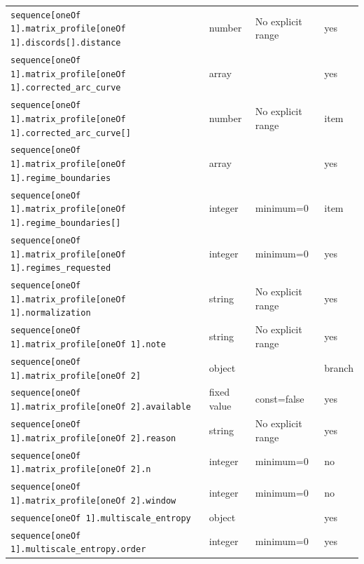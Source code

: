\begin{longtable}{@{}p{}p{}p{}p{}@{}}
\texttt{sequence[oneOf 1].\allowbreak{}matrix\_\allowbreak{}profile[oneOf 1].\allowbreak{}discords[].\allowbreak{}distance} & number & No explicit range & yes\\
\texttt{sequence[oneOf 1].\allowbreak{}matrix\_\allowbreak{}profile[oneOf 1].\allowbreak{}corrected\_\allowbreak{}arc\_\allowbreak{}curve} & array &  & yes\\
\texttt{sequence[oneOf 1].\allowbreak{}matrix\_\allowbreak{}profile[oneOf 1].\allowbreak{}corrected\_\allowbreak{}arc\_\allowbreak{}curve[]} & number & No explicit range & item\\
\texttt{sequence[oneOf 1].\allowbreak{}matrix\_\allowbreak{}profile[oneOf 1].\allowbreak{}regime\_\allowbreak{}boundaries} & array &  & yes\\
\texttt{sequence[oneOf 1].\allowbreak{}matrix\_\allowbreak{}profile[oneOf 1].\allowbreak{}regime\_\allowbreak{}boundaries[]} & integer & minimum=0 & item\\
\texttt{sequence[oneOf 1].\allowbreak{}matrix\_\allowbreak{}profile[oneOf 1].\allowbreak{}regimes\_\allowbreak{}requested} & integer & minimum=0 & yes\\
\texttt{sequence[oneOf 1].\allowbreak{}matrix\_\allowbreak{}profile[oneOf 1].\allowbreak{}normalization} & string & No explicit range & yes\\
\texttt{sequence[oneOf 1].\allowbreak{}matrix\_\allowbreak{}profile[oneOf 1].\allowbreak{}note} & string & No explicit range & yes\\
\texttt{sequence[oneOf 1].\allowbreak{}matrix\_\allowbreak{}profile[oneOf 2]} & object &  & branch\\
\texttt{sequence[oneOf 1].\allowbreak{}matrix\_\allowbreak{}profile[oneOf 2].\allowbreak{}available} & fixed value & const=false & yes\\
\texttt{sequence[oneOf 1].\allowbreak{}matrix\_\allowbreak{}profile[oneOf 2].\allowbreak{}reason} & string & No explicit range & yes\\
\texttt{sequence[oneOf 1].\allowbreak{}matrix\_\allowbreak{}profile[oneOf 2].\allowbreak{}n} & integer & minimum=0 & no\\
\texttt{sequence[oneOf 1].\allowbreak{}matrix\_\allowbreak{}profile[oneOf 2].\allowbreak{}window} & integer & minimum=0 & no\\
\texttt{sequence[oneOf 1].\allowbreak{}multiscale\_\allowbreak{}entropy} & object &  & yes\\
\texttt{sequence[oneOf 1].\allowbreak{}multiscale\_\allowbreak{}entropy.\allowbreak{}order} & integer & minimum=0 & yes\\

\end{longtable}
